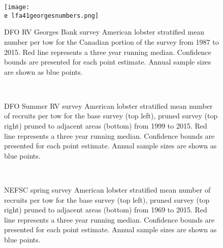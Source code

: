 \documentclass[11pt]{article}
\newcommand{\e}{/backup/bio_data/bio.lobster/figures/} %
\begin{document}
\begin{figure}

    \texttt{[image: \\e lfa41georgesnumbers.png]}
    \caption{DFO RV Georges Bank survey American lobster stratified mean number per tow for the Canadian portion of the survey from 1987 to 2015. Red line represents a three year running median. Confidence bounds are presented for each point estimate. Annual sample sizes are shown as blue points. }

\end{figure}



\begin{figure}
\centering
{}
\\

\caption{DFO Summer RV survey American lobster stratified mean number of recruits per tow for the base survey (top left), pruned survey (top right) pruned to adjacent areas (bottom) from 1999 to 2015. Red line represents a three year running median. Confidence bounds are presented for each point estimate. Annual sample sizes are shown as blue points. }
\end{figure}
\clearpage



\begin{figure}
\centering
{}
\\

\caption{NEFSC spring survey American lobster stratified mean number of recruits per tow for the base survey (top left), pruned survey (top right) pruned to adjacent areas (bottom) from 1969 to 2015. Red line represents a three year running median. Confidence bounds are presented for each point estimate. Annual sample sizes are shown as blue points. }
\end{figure}
\clearpage
\end{document}
